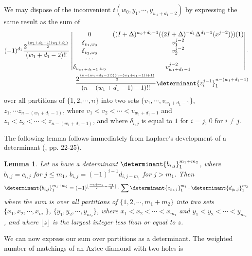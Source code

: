 \documentclass[10pt,reqno]{amsart}
\theoremstyle{plain}
\newtheorem{Lem}[Thm]{Lemma}
\theoremstyle{definition}
\theoremstyle{remark}
\begin{document}
We may dispose of the inconvenient $t(w_0,y_1,\dotsb,y_{w_1+d_1-2})$
by expressing the same result as the sum of
\begin{equation}
\begin{aligned}
(-1)^{d_1}
\frac{2^{\frac{(w_1+d_1-1)(w_1+d_1)}{2}}}{(w_1+d_1-2)!!}
\begin{vmatrix}
0 & ((I+\Delta)^{w_0+d_0-1}((2I+\Delta)^{-d_1}\Delta^{d_1-1}(x^{j-2})))(1) \\
\delta_{v_1,w_0} & v_1^{j-2} \\
\delta_{v_2,w_0} & v_2^{j-2} \\
\dotsb \\
\delta_{v_{w_1+d_1-1},w_0} & v_{w_1+d_1-1}^{j-2}
\end{vmatrix}
\cdot \\
\frac{2^{\frac{(n-(w_1+d_1-1))((n-(w_1+d_1-1))+1)}{2}}}
	{(n-(w_1+d_1-1)-1)!!} 
\determinant{z_i^{j-1}}_1^{n-(w_1+d_1-1)}
\end{aligned}
\end{equation}
over all partitions of $\{1,2,\dotsb ,n\}$ into two sets
$\{v_1,\dotsb,v_{w_1+d_1-1}\}$, $z_1,\dotsb z_{n-(w_1+d_1-1)}$,
where $v_1<v_2<\dotsb <v_{w_1+d_1-1}$ and $z_1<z_2<\dotsb<z_{n-(w_1+d_1-1)}$,
and where $\delta_{i,j}$ is equal to $1$ for $i=j$, $0$ for $i\ne j$.

The following lemma follows immediately from Laplace's development of
a determinant (\cite{Turnbull}, pp. 22-25).

\begin{Lem} \label{Lemma:C}
Let us have a determinant $\determinant{b_{i,j}}_1^{m_1+m_2}$, where
$b_{i,j} = c_{i,j}$ for $j\leq m_1$, $b_{i,j} = (-1)^{i-1} d_{i,j-m_1}$ for
$j>m_1$. Then 
\begin{equation}
\determinant{b_{i,j}}_1^{m_1+m_2} =
  (-1)^{\lfloor \frac{m_1+m_2}{2} - \frac{m_1}{2} \rfloor } \cdot
\sum \determinant{c_{x_i,j}}_1^{m_1} \cdot 
     \determinant{d_{y_i,j}}_1^{m_2}
\end{equation}
where the sum is over all partitions of $\{1,2,\dotsb , m_1+m_2\}$
into two sets $\{x_1,x_2,\dotsb , x_{m_1}\}$, $\{y_1,y_2,\dotsb , y_{m_2}\}$,
where $x_1<x_2<\dotsb <x_{m_1}$ and $y_1<y_2<\dotsb < y_{m_2}$,
and where $\lfloor z \rfloor$ is the largest integer less than or
equal to $z$.
\end{Lem}

We can now express our sum over partitions as a determinant. The
weighted number of matchings of an Aztec diamond with two holes is
\end{document}

